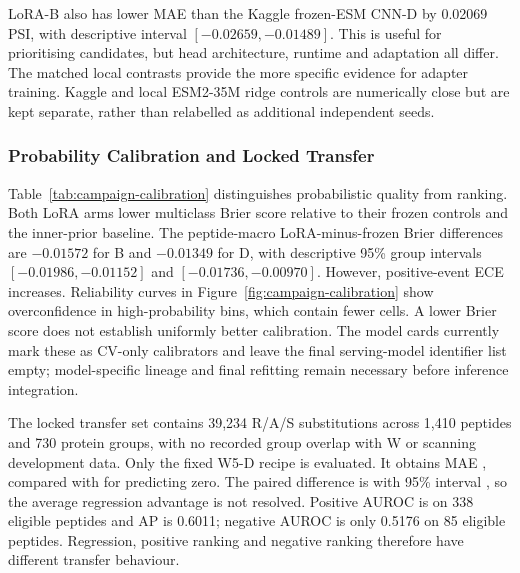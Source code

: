 LoRA-B also has lower MAE than the Kaggle frozen-ESM CNN-D by 0.02069 PSI, with descriptive
interval $[-0.02659,-0.01489]$. This is useful for prioritising candidates, but head architecture,
runtime and adaptation all differ. The matched local contrasts provide the more specific evidence
for adapter training. Kaggle and local ESM2-35M ridge controls are numerically close but are kept
separate, rather than relabelled as additional independent seeds.

\subsubsection{Probability Calibration and Locked Transfer}\label{sec:campaign-calibration-transfer}
Table~\ref{tab:campaign-calibration} distinguishes probabilistic quality from ranking. Both LoRA
arms lower multiclass Brier score relative to their frozen controls and the inner-prior baseline.
The peptide-macro LoRA-minus-frozen Brier differences are $-0.01572$ for B and $-0.01349$ for D,
with descriptive 95\% group intervals $[-0.01986,-0.01152]$ and $[-0.01736,-0.00970]$.
However, positive-event ECE increases. Reliability curves in Figure~\ref{fig:campaign-calibration}
show overconfidence in high-probability bins, which contain fewer cells. A lower Brier score does
not establish uniformly better calibration. The model cards currently mark these as CV-only
calibrators and leave the final serving-model identifier list empty; model-specific lineage and
final refitting remain necessary before inference integration.

\begin{table}[htbp]
  \centering
  \caption{Out-of-fold three-class probability evaluation. Brier is the unnormalised sum across
  three classes; lower values are better. The prior uses inner-validation class frequencies.
  ECE refers only to the positive event and uses ten equal-width bins.}
  \label{tab:campaign-calibration}
  
\end{table}

The locked transfer set contains 39,234 R/A/S substitutions across 1,410 peptides and 730 protein
groups, with no recorded group overlap with W or scanning development data. Only the fixed W5-D
recipe is evaluated. It obtains MAE \nCampaignTMaE{}, compared with \nCampaignTZero{} for
predicting zero. The paired difference is \nCampaignTDelta{} with 95\% interval
\nCampaignTCI{}, so the average regression advantage is not resolved. Positive AUROC is
\nCampaignTAuc{} on 338 eligible peptides and AP is 0.6011; negative AUROC is only 0.5176 on
85 eligible peptides. Regression, positive ranking and negative ranking therefore have different
transfer behaviour.

